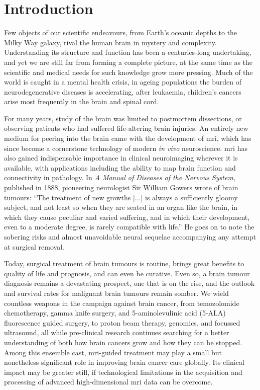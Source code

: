 \chapter*{Introduction}
\label{chapterlabel0}

Few objects of our scientific endeavours, from Earth's oceanic depths to the Milky Way galaxy, rival the human brain in mystery and complexity.
Understanding its structure and function has been a centuries-long undertaking, and yet we are still far from forming a complete picture, at the same time as the scientific and medical needs for such knowledge grow more pressing.
Much of the world is caught in a mental health crisis\autocite{Patel2018,Liu2020,Yang2021a}, in ageing populations the burden of neurodegenerative diseases is accelerating\autocite{Deuschl2020,Li2022}, after leukaemia, children's cancers arise most frequently in the brain and spinal cord\autocite{Ostrom2015}.

For many years, study of the brain was limited to postmortem dissections, or observing patients who had suffered life-altering brain injuries.
An entirely new medium for peering into the brain came with the development of \gls{mri}, which has since become a cornerstone technology of modern \textit{in vivo} neuroscience.
\Gls{mri} has also gained indispensable importance in clinical neuroimaging wherever it is available\autocite{Geethanath2019}, with applications including the ability to map brain function and connectivity in pathology.
In \textit{A Manual of Diseases of the Nervous System}, published in 1888, pioneering neurologist Sir William Gowers wrote of brain tumours:
``The treatment of new growths [...] is always a sufficiently gloomy subject, and not least so when they are seated in an organ like the brain, in which they cause peculiar and varied suffering, and in which their development, even to a moderate degree, is rarely compatible with life.''\autocite{Gowers1888}
He goes on to note the sobering risks and almost unavoidable neural sequelae accompanying any attempt at surgical removal.

Today, surgical treatment of brain tumours is routine, brings great benefits to quality of life and prognosis, and can even be curative.
Even so, a brain tumour diagnosis remains a devastating prospect, one that is on the rise, and the outlook and survival rates for malignant brain tumours remain somber\autocite{Aldape2019}.
We wield countless weapons in the campaign against brain cancer, from temozolomide chemotherapy, gamma knife surgery, and 5-aminolevulinic acid (5-ALA) fluorescence guided surgery, to proton beam therapy, genomics, and focussed ultrasound, all while pre-clinical research continues searching for a better understanding of both how brain cancers grow and how they can be stopped.
Among this ensemble cast, \gls{mri}-guided treatment may play a small but nonetheless significant role in improving brain cancer care globally.
Its clinical impact may be greater still, if technological limitations in the acquisition and processing of advanced high-dimensional \gls{mri} data can be overcome.

